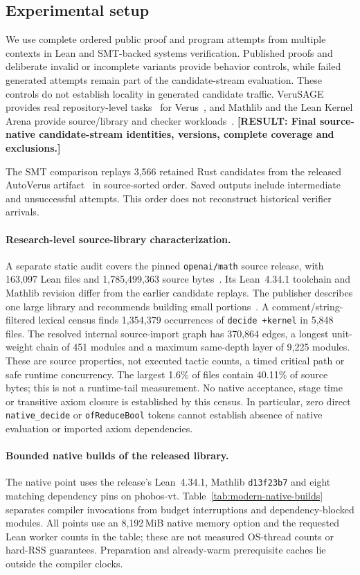 \documentclass[10pt,twocolumn]{article}
\newcommand{\missing}[1]{\textbf{[RESULT: #1]}}
\begin{document}
\subsection{Experimental setup}
We use complete ordered public proof and program attempts from multiple contexts in Lean and SMT-backed systems verification. Published proofs and deliberate invalid or incomplete variants provide behavior controls, while failed generated attempts remain part of the candidate-stream evaluation. These controls do not establish locality in generated candidate traffic. VeruSAGE provides real repository-level tasks~\cite{verusage,verusagePaper} for Verus~\cite{verus}, and Mathlib and the Lean Kernel Arena provide source/library and checker workloads~\cite{mathlib,leanArena}. \missing{Final source-native candidate-stream identities, versions, complete coverage and exclusions.}

The SMT comparison replays 3,566 retained Rust candidates from the released
AutoVerus artifact~\cite{autoverusArtifact} in source-sorted order. Saved outputs
include intermediate and unsuccessful attempts. This order does not reconstruct
historical verifier arrivals.

\paragraph{Research-level source-library characterization.}
A separate static audit covers the pinned \texttt{openai/math} source release,
with 163,097 Lean files and 1,785,499,363 source bytes~\cite{openaiMathSource}.
Its Lean~4.34.1 toolchain and Mathlib revision differ from the earlier
candidate replays. The publisher describes one large library and recommends
building small portions~\cite{openaiMathSource}.
A comment/string-filtered lexical census finds 1,354,379 occurrences of
\texttt{decide +kernel} in 5,848 files. The resolved internal source-import
graph has 370,864 edges, a longest unit-weight chain of 451 modules and a
maximum same-depth layer of 9,225 modules. These are source properties,
not executed tactic counts, a timed critical path or safe runtime concurrency.
The largest 1.6\% of files contain 40.11\% of source bytes; this is not a
runtime-tail measurement. No native acceptance, stage time or transitive
axiom closure is established by this census. In particular, zero direct
\texttt{native\_decide} or \texttt{ofReduceBool} tokens cannot establish absence
of native evaluation or imported axiom dependencies.

\paragraph{Bounded native builds of the released library.}
The native point uses the release's Lean~4.34.1, Mathlib
\texttt{d13f23b7} and eight matching dependency pins on phobos-vt.
Table~\ref{tab:modern-native-builds} separates compiler invocations from
budget interruptions and dependency-blocked modules. All points use an
8,192\,MiB native memory option and the requested Lean worker counts in the
table; these are not measured OS-thread counts or hard-RSS guarantees.
Preparation and already-warm prerequisite
caches lie outside the compiler clocks.
\end{document}
